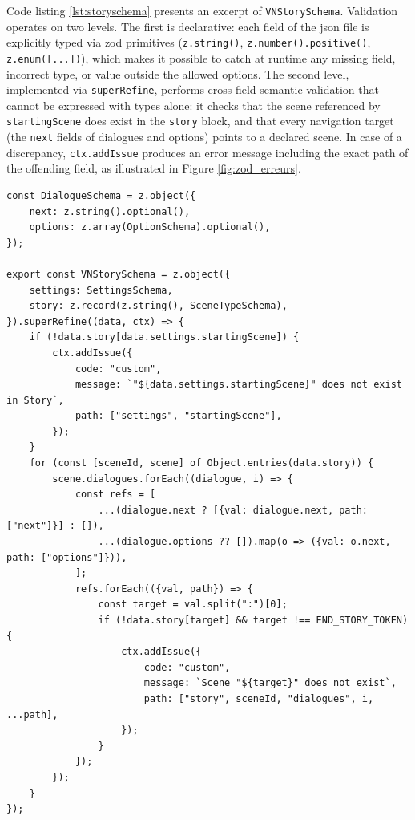 Code listing \ref{lst:storyschema} presents an excerpt of \texttt{VNStorySchema}. Validation operates on two levels. The first is declarative: each field of the \gls{json} file is explicitly typed via \gls{zod} primitives (\texttt{z.string()}, \texttt{z.number().positive()}, \texttt{z.enum([...])}), which makes it possible to catch at runtime any missing field, incorrect type, or value outside the allowed options. The second level, implemented via \texttt{superRefine}, performs cross-field semantic validation that cannot be expressed with types alone: it checks that the scene referenced by \texttt{startingScene} does exist in the \texttt{story} block, and that every navigation target (the \texttt{next} fields of dialogues and options) points to a declared scene. In case of a discrepancy, \texttt{ctx.addIssue} produces an error message including the exact path of the offending field, as illustrated in Figure \ref{fig:zod_erreurs}.

\begin{listing}[H]
\begin{verbatim}
const DialogueSchema = z.object({
    next: z.string().optional(),
    options: z.array(OptionSchema).optional(),
});

export const VNStorySchema = z.object({
    settings: SettingsSchema,
    story: z.record(z.string(), SceneTypeSchema),
}).superRefine((data, ctx) => {
    if (!data.story[data.settings.startingScene]) {
        ctx.addIssue({
            code: "custom",
            message: `"${data.settings.startingScene}" does not exist in Story`,
            path: ["settings", "startingScene"],
        });
    }
    for (const [sceneId, scene] of Object.entries(data.story)) {
        scene.dialogues.forEach((dialogue, i) => {
            const refs = [
                ...(dialogue.next ? [{val: dialogue.next, path: ["next"]}] : []),
                ...(dialogue.options ?? []).map(o => ({val: o.next, path: ["options"]})),
            ];
            refs.forEach(({val, path}) => {
                const target = val.split(":")[0];
                if (!data.story[target] && target !== END_STORY_TOKEN) {
                    ctx.addIssue({
                        code: "custom",
                        message: `Scene "${target}" does not exist`,
                        path: ["story", sceneId, "dialogues", i, ...path],
                    });
                }
            });
        });
    }
});
\end{verbatim}
\caption{Excerpt of \texttt{VNStorySchema}: declarative validation and semantic verification of navigation references (Author 2026)}
\label{lst:storyschema}
\end{listing}

